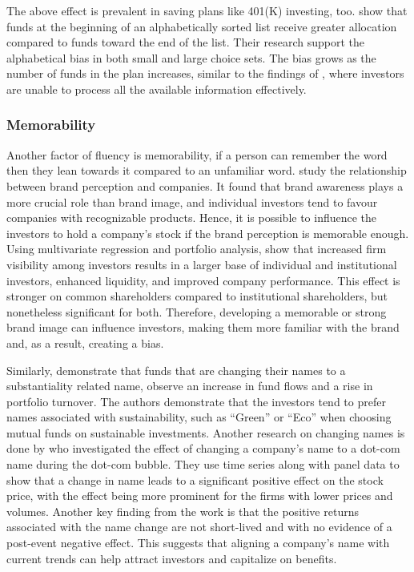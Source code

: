 \documentclass[a4paper,11pt]{report}
\begin{document}
The above effect is prevalent in saving plans like 401(K) investing, too.  show that funds at the beginning of an alphabetically sorted list receive greater allocation compared to funds toward the end of the list. Their research support the alphabetical bias in both small and large choice sets. The bias grows as the number of funds in the plan increases, similar to the findings of , where investors are unable to process all the available information effectively.

\subsubsection{Memorability}
Another factor of fluency is memorability, if a person can remember the word then they lean towards it compared to an unfamiliar word.  study the relationship between brand perception and companies. It found that brand awareness plays a more crucial role than brand image, and individual investors tend to favour companies with recognizable products. Hence, it is possible to influence the investors to hold a company's stock if the brand perception is memorable enough. Using multivariate regression and portfolio analysis,  show that increased firm visibility among investors results in a larger base of individual and institutional investors, enhanced liquidity, and improved company performance. This effect is stronger on common shareholders compared to institutional shareholders, but nonetheless significant for both. Therefore, developing a memorable or strong brand image can influence investors, making them more familiar with the brand and, as a result, creating a bias.

Similarly,  demonstrate that funds that are changing their names to a substantiality related name, observe an increase in fund flows and a rise in portfolio turnover. The authors demonstrate that the investors tend to prefer names associated with sustainability, such as ``Green'' or ``Eco'' when choosing mutual funds on sustainable investments. Another research on changing names is done by  who investigated the effect of changing a company's name to a dot-com name during the dot-com bubble. They use time series along with panel data to show that a change in name leads to a significant positive effect on the stock price, with the effect being more prominent for the firms with lower prices and volumes. Another key finding from the work is that the positive returns associated with the name change are not short-lived and with no evidence of a post-event negative effect. This suggests that aligning a company's name with current trends can help attract investors and capitalize on benefits.
\end{document}

